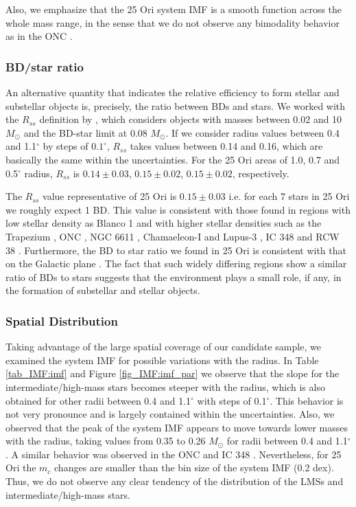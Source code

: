 \documentclass[12pt]{article}
\begin{document}
Also, we emphasize that the 25 Ori system IMF is a smooth function across the whole mass range, in the sense that we do not observe any bimodality behavior as in the ONC \citep{Drass2016}.

\subsubsection{BD/star ratio}
\label{sec_IMF:BD_star_ratio}
An alternative quantity that indicates the relative efficiency to form stellar and substellar objects is, precisely, the ratio between BDs and stars. We worked with the $R_{ss}$ definition by \citet{Briceno2002}, which considers objects with masses between 0.02 and 10 $M_\odot$ and the BD-star limit at 0.08 $M_\odot$. If we consider radius values between 0.4 and 1.1$^\circ$ by steps of $0.1^\circ$, $R_{ss}$ takes values between 0.14 and 0.16, which are basically the same within the uncertainties. For the 25 Ori areas of 1.0, 0.7 and 0.5$^\circ$ radius, $R_{ss}$ is $0.14\pm0.03$, $0.15\pm0.02$, $0.15\pm0.02$, respectively.

The $R_{ss}$ value representative of 25 Ori is $0.15\pm0.03$ i.e. for each 7 stars in 25 Ori we roughly expect 1 BD. This value is consistent with those found in regions with low stellar density as Blanco 1 \citep{Moraux2007a} and with higher stellar densities such as the Trapezium \citep{Muench2002}, ONC \citep{Kroupa-Bouvier2003}, NGC 6611 \citep{Oliveira2009}, Chamaeleon-I and Lupus-3 \citep{Muzic2015}, IC 348 \citep{Scholz2013} and RCW 38 \citep[as a lower quote; ][]{Muzic2017}. Furthermore, the BD to star ratio we found in 25 Ori is consistent with that on the Galactic plane \citep{Bihain-Scholz2016}. The fact that such widely differing regions show a similar ratio of BDs to stars suggests that the environment plays a small role, if any, in the formation of substellar and stellar objects.

\subsubsection{Spatial Distribution}
\label{sec_IMF:spatial_distribution}
Taking advantage of the large spatial coverage of our candidate sample, we examined the system IMF for possible variations with the radius. In Table \ref{tab_IMF:imf} and Figure \ref{fig_IMF:imf_par} we observe that the slope for the intermediate/high-mass stars becomes steeper with the radius, which is also obtained for other radii between 0.4 and 1.1$^\circ$ with steps of 0.1$^\circ$. This behavior is not very pronounce and is largely contained within the uncertainties. Also, we observed that the peak of the system IMF appears to move towards lower masses with the radius, taking values from 0.35 to 0.26 $M_\odot$ for radii between 0.4 and 1.1$^\circ$. A similar behavior was observed in the ONC \citep{Hillenbrand2000} and IC 348 \citep{Muench2002}. Nevertheless, for 25 Ori the $m_c$ changes are smaller than the bin size of the system IMF (0.2 dex). Thus, we do not observe any clear tendency of the distribution of the LMSs and intermediate/high-mass stars.
\end{document}
